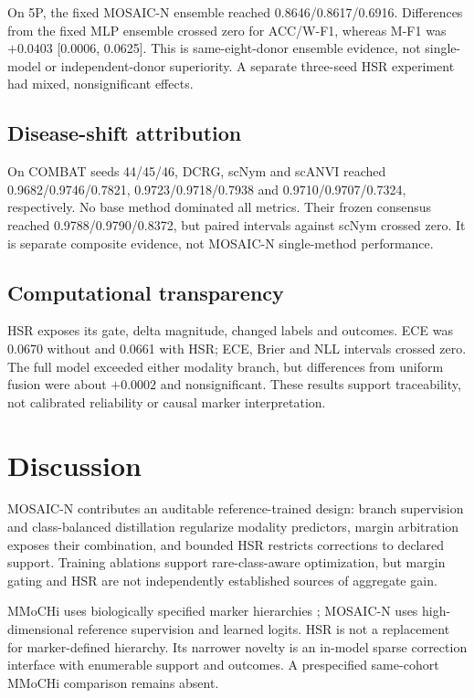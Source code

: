 \documentclass[unnumsec,webpdf,contemporary,large,numbered]{oup-authoring-template}
\begin{document}
On 5P, the fixed MOSAIC-N ensemble reached 0.8646/0.8617/0.6916. Differences from the fixed MLP ensemble crossed zero for ACC/W-F1, whereas M-F1 was $+0.0403$ [0.0006, 0.0625]. This is same-eight-donor ensemble evidence, not single-model or independent-donor superiority. A separate three-seed HSR experiment had mixed, nonsignificant effects.

\subsection{Disease-shift attribution}

On COMBAT seeds 44/45/46, DCRG, scNym and scANVI reached 0.9682/0.9746/0.7821, 0.9723/0.9718/0.7938 and 0.9710/0.9707/0.7324, respectively. No base method dominated all metrics. Their frozen consensus reached 0.9788/0.9790/0.8372, but paired intervals against scNym crossed zero. It is separate composite evidence, not MOSAIC-N single-method performance.

\subsection{Computational transparency}

HSR exposes its gate, delta magnitude, changed labels and outcomes. ECE was 0.0670 without and 0.0661 with HSR; ECE, Brier and NLL intervals crossed zero. The full model exceeded either modality branch, but differences from uniform fusion were about $+0.0002$ and nonsignificant. These results support traceability, not calibrated reliability or causal marker interpretation.

\section{Discussion}

MOSAIC-N contributes an auditable reference-trained design: branch supervision and class-balanced distillation regularize modality predictors, margin arbitration exposes their combination, and bounded HSR restricts corrections to declared support. Training ablations support rare-class-aware optimization, but margin gating and HSR are not independently established sources of aggregate gain.

MMoCHi uses biologically specified marker hierarchies \citep{caron2025mmochi}; MOSAIC-N uses high-dimensional reference supervision and learned logits. HSR is not a replacement for marker-defined hierarchy. Its narrower novelty is an in-model sparse correction interface with enumerable support and outcomes. A prespecified same-cohort MMoCHi comparison remains absent.
\end{document}
